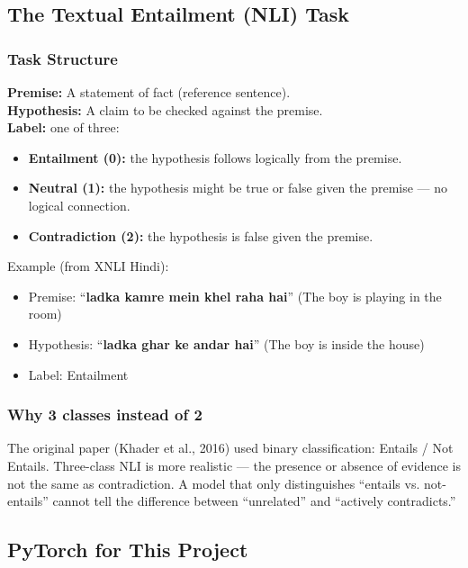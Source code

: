 \subsection{The Textual Entailment (NLI) Task}

\subsubsection{Task Structure}

\textbf{Premise:} A statement of fact (reference sentence).\\
\textbf{Hypothesis:} A claim to be checked against the premise.\\
\textbf{Label:} one of three:
\begin{itemize}[nosep]
    \item \textbf{Entailment (0):} the hypothesis follows logically from the premise.
    \item \textbf{Neutral (1):} the hypothesis might be true or false given the premise --- no logical connection.
    \item \textbf{Contradiction (2):} the hypothesis is false given the premise.
\end{itemize}

Example (from XNLI Hindi):
\begin{itemize}[nosep]
    \item Premise: ``\textsf{\textbf{ladka kamre mein khel raha hai}}'' (The boy is playing in the room)
    \item Hypothesis: ``\textsf{\textbf{ladka ghar ke andar hai}}'' (The boy is inside the house)
    \item Label: Entailment
\end{itemize}

\subsubsection{Why 3 classes instead of 2}

The original paper (Khader et al., 2016) used binary classification: Entails / Not Entails. Three-class NLI is more realistic --- the presence or absence of evidence is not the same as contradiction. A model that only distinguishes ``entails vs. not-entails'' cannot tell the difference between ``unrelated'' and ``actively contradicts.''

\subsection{PyTorch for This Project}

